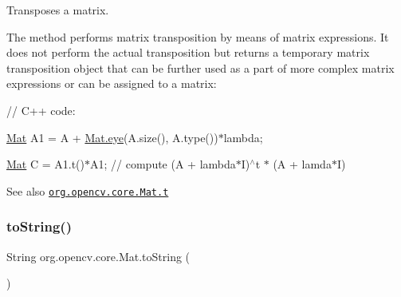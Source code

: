 Transposes a matrix.

The method performs matrix transposition by means of matrix expressions. It does not perform the actual transposition but returns a temporary matrix transposition object that can be further used as a part of more complex matrix expressions or can be assigned to a matrix\+: {\ttfamily }

{\ttfamily }

{\ttfamily }

{\ttfamily // C++ code\+:}

{\ttfamily }

{\ttfamily }

{\ttfamily \mbox{\hyperlink{classorg_1_1opencv_1_1core_1_1_mat}{Mat}} A1 = A + \mbox{\hyperlink{classorg_1_1opencv_1_1core_1_1_mat_a4de6ffd10feb724153f1ec1231533aa9}{Mat.\+eye}}(A.\+size(), A.\+type())$\ast$lambda;}

{\ttfamily }

{\ttfamily }

{\ttfamily \mbox{\hyperlink{classorg_1_1opencv_1_1core_1_1_mat}{Mat}} C = A1.\+t()$\ast$\+A1; // compute (A + lambda$\ast$I)$^\wedge$t $\ast$ (A + lamda$\ast$I)}

{\ttfamily }

{\ttfamily \begin{DoxySeeAlso}{See also}
\href{http://docs.opencv.org/modules/core/doc/basic_structures.html#mat-t}{\tt org.\+opencv.\+core.\+Mat.\+t} 
\end{DoxySeeAlso}
}\mbox{\label{classorg_1_1opencv_1_1core_1_1_mat_a2652b30a9904641accc3bef6f071db2c}} 
\subsubsection{\texorpdfstring{to\+String()}{toString()}}
{\footnotesize\ttfamily String org.\+opencv.\+core.\+Mat.\+to\+String (\begin{DoxyParamCaption}{ }\end{DoxyParamCaption})}

\mbox{\label{classorg_1_1opencv_1_1core_1_1_mat_a0aa57e546fe72e994dafe806f47f0081}} 
